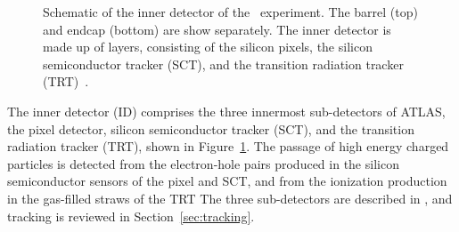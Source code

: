 \begin{figure}[p]
  \caption[
    Schematic of the inner detector of the
    \atlas\ experiment~\cite{1748-0221-3-08-S08003}.
  ]{
    Schematic of the inner detector of the \atlas\ experiment.
    The barrel (top) and endcap (bottom) are show separately.
    The inner detector is made up of layers, consisting of the silicon pixels,
    the silicon semiconductor tracker (SCT), and the transition radiation
    tracker (TRT)~\cite{1748-0221-3-08-S08003}.
  }
  \label{fig:id_cartoon}
\end{figure}

The inner detector (ID) comprises the three innermost sub-detectors of ATLAS,
the pixel detector, silicon semiconductor tracker (SCT), and the transition
radiation tracker (TRT), shown in Figure~\ref{fig:id_cartoon}.
The passage of high energy charged particles is detected from the electron-hole
pairs produced in the silicon semiconductor sensors of the pixel and SCT, and
from the ionization production in the gas-filled straws of the TRT
The three sub-detectors are described in ,
and tracking is reviewed in Section~\ref{sec:tracking}.

